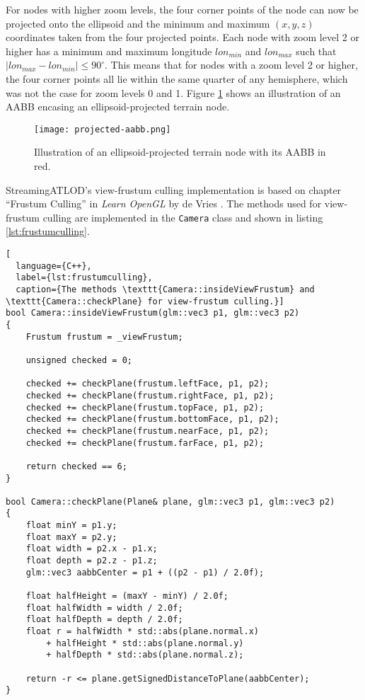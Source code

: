 For nodes with higher zoom levels, the four corner points of the node can now be projected onto the ellipsoid
and the minimum and maximum $(x,y,z)$ coordinates taken from the four projected points.
Each node with zoom level 2 or higher has a minimum and maximum longitude $lon_{min}$ and $lon_{max}$ such that 
$\lvert lon_{max} - lon_{min} \rvert \leq 90^{\circ}$. This means that for nodes with a zoom level 2 or higher, 
the four corner points all lie within the same quarter of any hemisphere, which was not
the case for zoom levels 0 and 1.
Figure \ref{fig:projected-aabb} shows an illustration of an AABB encasing an
ellipsoid-projected terrain node.

\begin{figure}[H]
  \centering
  \texttt{[image: projected-aabb.png]}
  \caption{Illustration of an ellipsoid-projected terrain node with 
  its AABB in red.}\label{fig:projected-aabb}
\end{figure}

StreamingATLOD's view-frustum culling implementation is based on chapter ``Frustum Culling'' in \textit{Learn OpenGL} by de Vries \cite{learnopengl}.
The methods used for view-frustum culling are implemented in the \texttt{Camera} class and shown in listing \ref{lst:frustumculling}.

\begin{lstlisting}[
  language={C++},
  label={lst:frustumculling},
  caption={The methods \texttt{Camera::insideViewFrustum} and \texttt{Camera::checkPlane} for view-frustum culling.}]
bool Camera::insideViewFrustum(glm::vec3 p1, glm::vec3 p2)
{
    Frustum frustum = _viewFrustum;

    unsigned checked = 0;

    checked += checkPlane(frustum.leftFace, p1, p2);
    checked += checkPlane(frustum.rightFace, p1, p2);
    checked += checkPlane(frustum.topFace, p1, p2);
    checked += checkPlane(frustum.bottomFace, p1, p2);
    checked += checkPlane(frustum.nearFace, p1, p2);
    checked += checkPlane(frustum.farFace, p1, p2);

    return checked == 6;
}

bool Camera::checkPlane(Plane& plane, glm::vec3 p1, glm::vec3 p2)
{
    float minY = p1.y;
    float maxY = p2.y;
    float width = p2.x - p1.x;
    float depth = p2.z - p1.z;
    glm::vec3 aabbCenter = p1 + ((p2 - p1) / 2.0f);

    float halfHeight = (maxY - minY) / 2.0f;
    float halfWidth = width / 2.0f;
    float halfDepth = depth / 2.0f;
    float r = halfWidth * std::abs(plane.normal.x)
        + halfHeight * std::abs(plane.normal.y)
        + halfDepth * std::abs(plane.normal.z);

    return -r <= plane.getSignedDistanceToPlane(aabbCenter);
}
\end{lstlisting}

